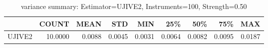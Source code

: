 \begin{table}[ht]
\centering
\caption{variance summary: Estimator=UJIVE2, Instruments=100, Strength=0.50}
\begin{tabular}{lrrrrrrrr}
\toprule
 & COUNT & MEAN & STD & MIN & 25\% & 50\% & 75\% & MAX \\
\midrule
UJIVE2 & 10.0000 & 0.0088 & 0.0045 & 0.0031 & 0.0064 & 0.0082 & 0.0095 & 0.0187 \\
\bottomrule
\end{tabular}
\end{table}
